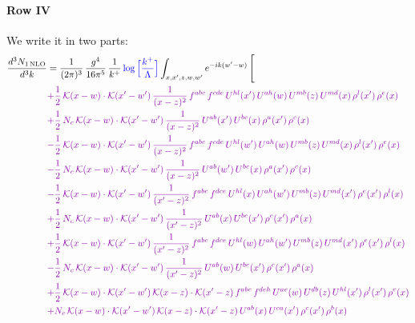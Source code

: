 \documentclass[10pt]{article}
\numberwithin{equation}{section}
\newcommand{\new}[1]{{\color{blue}#1}}
\begin{document}
\paragraph{Row IV}
We write it in two parts: 
\begin{align}
\frac{d^{3}N_{1\,\mathrm{NLO}}}{d^{3}k} & = \frac{1}{(2\pi)^{3}}\,\frac{g^{4}}{16\pi^{5}}\,\frac{1}{k^{+}}\,\new{\log\Big[\frac{k^{+}}{\Lambda}\Big]}\int_{x,x',z,w,w'}e^{-ik(w'-w)}\,\Bigg[\notag\\ &{\color{CC} 
 +\frac{1}{2}\,\mathcal{K}(x-w)\cdot\mathcal{K}(x'-w')\,\frac{1}{(x-z)^{2}}\,f^{abc}\,f^{cde}\,U^{hl}(x')\,U^{ah}(w)\,U^{mb}(z)\,U^{md}(x)\,\rho^{l}(x')\,\rho^{e}(x)} \notag\\
&{\color{CC} +\frac{1}{2}\,N_{c}\,\mathcal{K}(x-w)\cdot\mathcal{K}(x'-w')\,\frac{1}{(x-z)^{2}}\,U^{ab}(x')\,U^{bc}(x)\,\rho^{a}(x')\,\rho^{c}(x)} \notag\\
&{\color{CC} -\frac{1}{2}\,\mathcal{K}(x-w)\cdot\mathcal{K}(x'-w')\,\frac{1}{(x-z)^{2}}\,f^{abc}\,f^{cde}\,U^{hl}(w')\,U^{ah}(w)\,U^{mb}(z)\,U^{md}(x)\,\rho^{l}(x')\,\rho^{e}(x)} \notag\\
&{\color{CC} -\frac{1}{2}\,N_{c}\,\mathcal{K}(x-w)\cdot\mathcal{K}(x'-w')\,\frac{1}{(x-z)^{2}}\,U^{ab}(w')\,U^{bc}(x)\,\rho^{a}(x')\,\rho^{c}(x)} \notag\\
&{\color{CC} -\frac{1}{2}\,\mathcal{K}(x-w)\cdot\mathcal{K}(x'-w')\,\frac{1}{(x'-z)^{2}}\,f^{abc}\,f^{dce}\,U^{hl}(x)\,U^{ah}(w')\,U^{mb}(z)\,U^{md}(x')\,\rho^{e}(x')\,\rho^{l}(x)} \notag\\
&{\color{CC} +\frac{1}{2}\,N_{c}\,\mathcal{K}(x-w)\cdot\mathcal{K}(x'-w')\,\frac{1}{(x'-z)^{2}}\,U^{ab}(x)\,U^{bc}(x')\,\rho^{c}(x')\,\rho^{a}(x)} \notag\\
&{\color{CC} +\frac{1}{2}\,\mathcal{K}(x-w)\cdot\mathcal{K}(x'-w')\,\frac{1}{(x'-z)^{2}}\,f^{abc}\,f^{dce}\,U^{hl}(w)\,U^{ah}(w')\,U^{mb}(z)\,U^{md}(x')\,\rho^{e}(x')\,\rho^{l}(x)} \notag\\
&{\color{CC} -\frac{1}{2}\,N_{c}\,\mathcal{K}(x-w)\cdot\mathcal{K}(x'-w')\,\frac{1}{(x'-z)^{2}}\,U^{ab}(w)\,U^{bc}(x')\,\rho^{c}(x')\,\rho^{a}(x)} \notag\\
&{\color{CC} +\frac{1}{2}\,\mathcal{K}(x-w)\cdot\mathcal{K}(x'-w')\,\mathcal{K}(x-z)\cdot\mathcal{K}(x'-z)\,f^{abc}\,f^{deh}\,U^{ae}(w)\,U^{db}(z)\,U^{hl}(x')\,\rho^{l}(x')\,\rho^{c}(x)} \notag\\
&{\color{CC} +N_{c}\,\mathcal{K}(x-w)\cdot\mathcal{K}(x'-w')\,\mathcal{K}(x-z)\cdot\mathcal{K}(x'-z)\,U^{ab}(x)\,U^{ca}(x')\,\rho^{c}(x')\,\rho^{b}(x)} \notag\\

\end{align}
\end{document}
